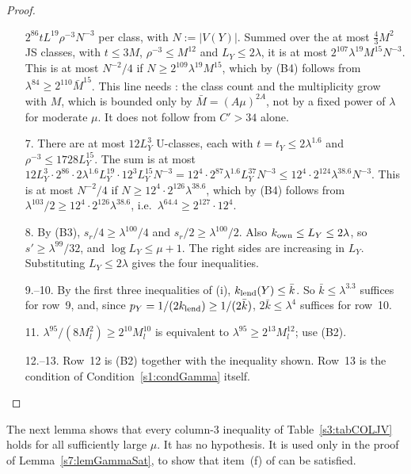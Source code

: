 \begin{proof}
\begin{itemize}
  $2^{86}tL^{19}\rho^{-3}N^{-3}$ per class, with $N:=|V(Y)|$. Summed over
  the at most $\frac43M^2$ JS classes, with $t\le3M$, $\rho^{-3}\le M^{12}$
  and $L_Y\le2\lambda$, it is at most $2^{107}\lambda^{19}M^{15}N^{-3}$.
  This is at most $N^{-2}/4$ if $N\ge2^{109}\lambda^{19}M^{15}$, which by
  (B4) follows from $\lambda^{84}\ge2^{110}\bar M^{15}$. This line
  needs : the class count and the multiplicity grow with $M$,
  which is bounded only by $\bar M=(A\mu)^{2A}$, not by a fixed power of
  $\lambda$ for moderate $\mu$. It
  does not follow from $C'>34$ alone.
\item[7.] There are at most $12L_Y^3$ U-classes, each with
  $t=t_Y\le2\lambda^{1.6}$ and $\rho^{-3}\le1728L_Y^{15}$. The sum is at most
  $12L_Y^3\cdot2^{86}\cdot2\lambda^{1.6}L_Y^{19}\cdot12^3L_Y^{15}N^{-3}
  =12^4\cdot2^{87}\lambda^{1.6}L_Y^{37}N^{-3}\le12^4\cdot2^{124}\lambda^{38.6}N^{-3}$.
  This is at most $N^{-2}/4$ if $N\ge12^4\cdot2^{126}\lambda^{38.6}$,
  which by (B4) follows from
  $\lambda^{103}/2\ge12^4\cdot2^{126}\lambda^{38.6}$, i.e.\
  $\lambda^{64.4}\ge2^{127}\cdot12^4$.
\item[8.] By (B3), $s_r/4\ge\lambda^{100}/4$ and $s_r/2\ge\lambda^{100}/2$.
  Also $k_{\mathrm{own}}\le L_Y\le2\lambda$, so $s'\ge\lambda^{99}/32$, and
  $\log L_Y\le\mu+1$. The right sides are increasing in $L_Y$.
  Substituting $L_Y\le2\lambda$ gives the four inequalities.
\item[9.--10.] By the first three inequalities of (i),
  $k_{\mathrm{lend}}(Y)\le\bar k$. So $\bar k\le\lambda^{3.3}$ suffices for row~9,
  and, since $p_Y=1/(2k_{\mathrm{lend}})\ge1/(2\bar k)$, $2\bar k\le\lambda^4$
  suffices for row~10.
\item[11.] $\lambda^{95}/(8M_l^2)\ge2^{10}M_l^{10}$ is equivalent to
  $\lambda^{95}\ge2^{13}M_l^{12}$; use (B2).
\item[12.--13.] Row~12 is (B2) together with the inequality shown. Row~13
  is the condition \Gstar of Condition~\ref{s1:condGamma} itself.
\end{itemize}
\end{proof}

The next lemma shows that every column-3 inequality of
Table~\ref{s3:tabCOLJV} holds for all sufficiently large $\mu$. It has no
hypothesis. It is used only in the proof of Lemma~\ref{s7:lemGammaSat}, to show
that item~(f) of \Gc{1} can be satisfied.

